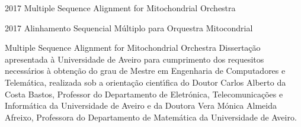 \documentclass[11pt,twoside,a4paper]{report}
\def\ThesisYear{2017}
\begin{document}
%
%

\TitlePage
         {\ThesisYear}
        {Multiple Sequence Alignment for Mitochondrial Orchestra}
\EndTitlePage
\titlepage\ \endtitlepage %

\TitlePage
         {\ThesisYear}
        {Alinhamento  Sequencial M\'ultiplo para Orquestra Mitocondrial}
\EndTitlePage
\titlepage\ \endtitlepage %


%
%

\TitlePage
  \HEADER{}{\ThesisYear}
        {Multiple Sequence Alignment for Mitochondrial Orchestra}
  \vspace*{15mm}
  \TEXT{}
       {Disserta\c c\~ao apresentada \`a Universidade de Aveiro para cumprimento dos requesitos
        necess\'arios \`a obten\c c\~ao do grau de Mestre em Engenharia de Computadores e Telem\'atica, realizada sob a orienta\c c\~ao
        cient\'\i fica do Doutor Carlos Alberto da Costa Bastos, Professor do Departamento de Eletr\'onica, Telecomunica\c c\~oes e Inform\'atica da Universidade de Aveiro e da Doutora Vera M\'onica Almeida Afreixo, Professora do Departamento de Matem\'atica da Universidade de Aveiro.}
\EndTitlePage
\titlepage\ \endtitlepage %
\end{document}
